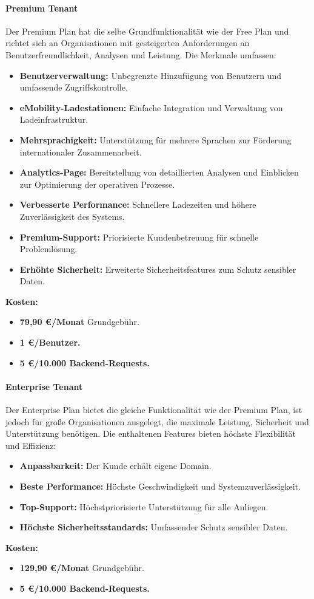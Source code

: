 \paragraph{Premium Tenant}
Der Premium Plan hat die selbe Grundfunktionalität wie der Free Plan und richtet sich an Organisationen mit gesteigerten Anforderungen an Benutzerfreundlichkeit, Analysen und Leistung.
Die Merkmale umfassen:
\begin{itemize}
	\item \textbf{Benutzerverwaltung:} Unbegrenzte Hinzufügung von Benutzern und umfassende Zugriffskontrolle.
	\item \textbf{eMobility-Ladestationen:} Einfache Integration und Verwaltung von Ladeinfrastruktur.
	\item \textbf{Mehrsprachigkeit:} Unterstützung für mehrere Sprachen zur Förderung internationaler Zusammenarbeit.
	\item \textbf{Analytics-Page:} Bereitstellung von detaillierten Analysen und Einblicken zur Optimierung der operativen Prozesse.
	\item \textbf{Verbesserte Performance:} Schnellere Ladezeiten und höhere Zuverlässigkeit des Systems.
	\item \textbf{Premium-Support:} Priorisierte Kundenbetreuung für schnelle Problemlösung.
	\item \textbf{Erhöhte Sicherheit:} Erweiterte Sicherheitsfeatures zum Schutz sensibler Daten.
\end{itemize}
\textbf{Kosten:}
\begin{itemize}
	\item \textbf{79,90 €/Monat} Grundgebühr.
	\item \textbf{1 €/Benutzer.}
	\item \textbf{5 €/10.000 Backend-Requests.}
\end{itemize}

\paragraph{Enterprise Tenant}
Der Enterprise Plan bietet die gleiche Funktionalität wie der Premium Plan, ist jedoch für große Organisationen ausgelegt, die maximale Leistung, Sicherheit und Unterstützung benötigen.
Die enthaltenen Features bieten höchste Flexibilität und Effizienz:
\begin{itemize}
	\item \textbf{Anpassbarkeit:} Der Kunde erhält eigene Domain.
	\item \textbf{Beste Performance:} Höchste Geschwindigkeit und Systemzuverlässigkeit.
	\item \textbf{Top-Support:} Höchstpriorisierte Unterstützung für alle Anliegen.
	\item \textbf{Höchste Sicherheitsstandards:} Umfassender Schutz sensibler Daten.
\end{itemize}
\textbf{Kosten:}
\begin{itemize}
	\item \textbf{129,90 €/Monat} Grundgebühr.
	\item \textbf{5 €/10.000 Backend-Requests.}
\end{itemize}

